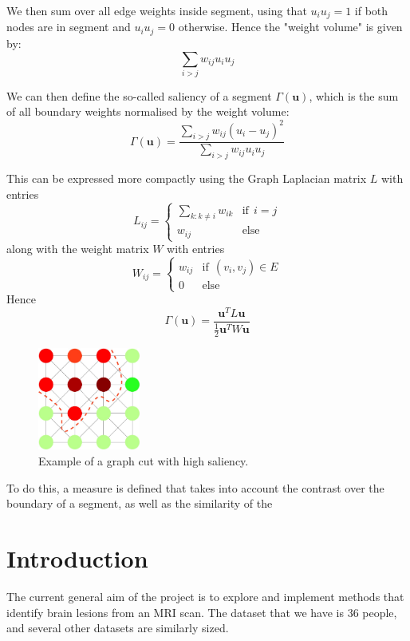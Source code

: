 \documentclass{report}
\begin{document}
We then sum over all edge weights inside segment,  using that $u_iu_j = 1$ if both nodes are in segment and $u_iu_j=0$ otherwise. Hence the "weight volume" is given by: 
\[\sum_{i>j} w_{ij}u_iu_j\]

We can then define the so-called saliency of a segment $\Gamma(\mathbf{u})$, which is the sum of all boundary weights normalised by the weight volume: 
\[\Gamma(\mathbf{u}) = \frac{\sum_{i>j} w_{ij}(u_i - u_j)^2}{\sum_{i>j} w_{ij}u_iu_j}\]
 
This can be expressed more compactly using the Graph Laplacian matrix $L$ with entries
\[L_{ij} = 
\begin{cases}
\sum_{k: k \neq i} w_{ik} & \text{if} \: \: i=j \\
w_{ij} & \text{else}
\end{cases}\]
along with the weight matrix $W$ with entries
\[W_{ij} =\begin{cases}
w_{ij} & \text{if} \: \: (v_i, v_j) \in E \\
0 & \text{else}
\end{cases} \]
Hence 
\[\Gamma(\mathbf{u}) = \frac{\mathbf{u}^TL\mathbf{u}}{\frac{1}{2}\mathbf{u}^TW\mathbf{u}}\]
\begin{figure}[h]
\centering
\includegraphics[width=0.3\textwidth]{GraphCutExample}
\caption{Example of a graph cut with high saliency.}
\end{figure}


To do this, a measure is defined that takes into account the contrast over the boundary of a segment, as well as the similarity of the 












\chapter{Introduction}
The current general aim of the project is to explore and implement methods that identify brain lesions from an MRI scan.  The dataset that we have is 36 people, and several other datasets are similarly sized. 
\end{document}
